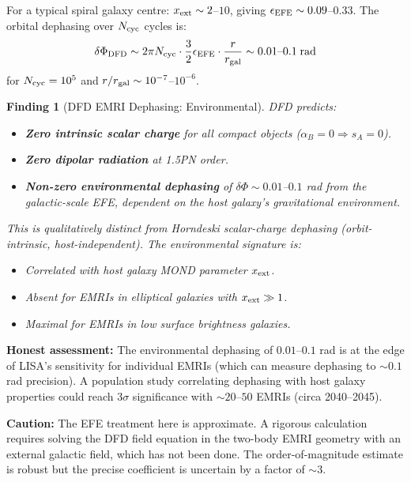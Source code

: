 \documentclass[11pt]{article}
\newtheorem{finding}{Finding}
\begin{document}
For a typical spiral galaxy centre: $x_{\rm ext} \sim 2$--$10$,
giving $\epsilon_{\rm EFE} \sim 0.09$--$0.33$. The orbital
dephasing over $N_{\rm cyc}$ cycles is:
\begin{equation}
\delta\Phi_{\rm DFD} \sim 2\pi N_{\rm cyc} \cdot
\frac{3}{2}\epsilon_{\rm EFE} \cdot \frac{r}{r_{\rm gal}}
\sim 0.01\text{--}0.1\;\text{rad}
\end{equation}
for $N_{\rm cyc} = 10^5$ and $r/r_{\rm gal} \sim 10^{-7}$--$10^{-6}$.

\begin{finding}[DFD EMRI Dephasing: Environmental]
\label{find:EMRI}
DFD predicts:
\begin{itemize}[nosep]
\item \textbf{Zero intrinsic scalar charge} for all compact objects
  ($\alpha_B = 0 \Rightarrow s_A = 0$).
\item \textbf{Zero dipolar radiation} at 1.5PN order.
\item \textbf{Non-zero environmental dephasing} of $\delta\Phi \sim
  0.01$--$0.1$ rad from the galactic-scale EFE, dependent on the
  host galaxy's gravitational environment.
\end{itemize}
This is qualitatively distinct from Horndeski scalar-charge dephasing
(orbit-intrinsic, host-independent). The environmental signature is:
\begin{itemize}[nosep]
\item Correlated with host galaxy MOND parameter $x_{\rm ext}$.
\item Absent for EMRIs in elliptical galaxies with $x_{\rm ext} \gg 1$.
\item Maximal for EMRIs in low surface brightness galaxies.
\end{itemize}
\end{finding}

\textbf{Honest assessment:} The environmental dephasing of $0.01$--$0.1$
rad is at the edge of LISA's sensitivity for individual EMRIs (which
can measure dephasing to $\sim 0.1$ rad precision). A population study
correlating dephasing with host galaxy properties could reach $3\sigma$
significance with $\sim 20$--$50$ EMRIs (circa 2040--2045).

\textbf{Caution:} The EFE treatment here is approximate. A rigorous
calculation requires solving the DFD field equation in the two-body
EMRI geometry with an external galactic field, which has not been done.
The order-of-magnitude estimate is robust but the precise coefficient
is uncertain by a factor of $\sim 3$.
\end{document}
